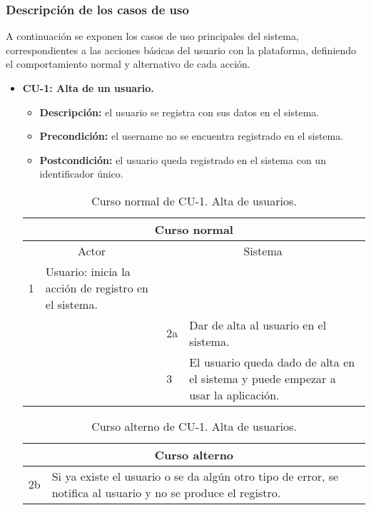 \subsubsection{Descripción de los casos de uso}
A continuación se exponen los casos de uso principales del sistema, correspondientes a las acciones básicas del usuario con la plataforma, definiendo el comportamiento normal y alternativo de cada acción.

\begin{itemize}
	\item \textbf{CU-1: Alta de un usuario.}
	\begin{itemize}
		\item \textbf{Descripción:} el usuario se registra con sus datos en el sistema.
		\item \textbf{Precondición:} el username no se encuentra registrado en el sistema.
		\item \textbf{Postcondición:} el usuario queda registrado en el sistema con un identificador único.
	\end{itemize}
	\begin{table}[H]
		\centering
		\begin{tabular}{|p{0.3cm}|p{5cm}|p{0.3cm}|p{5cm}|}
			\hline
			\multicolumn{4}{|c|}{Curso normal} \\ \hline
			\multicolumn{2}{|c|}{Actor} & \multicolumn{2}{|c|}{Sistema} \\ \hline
			1 & Usuario: inicia la acción de registro en el sistema. &  &  \\ \hline
			  &  & 2a & Dar de alta al usuario en el sistema. \\ \hline
			  &  & 3 & El usuario queda dado de alta en el sistema y puede empezar a usar la aplicación. \\ \hline
		\end{tabular}
		\caption{Curso normal de CU-1. Alta de usuarios.}
		\label{tabla:cu1-normal}
	\end{table}
	
	\begin{table}[H]
		\centering
		\begin{tabular}{|p{0.3cm}|p{10cm}|}
			\hline
			\multicolumn{2}{|c|}{Curso alterno} \\ \hline
			2b & Si ya existe el usuario o se da algún otro tipo de error, se notifica al usuario y no se produce el registro. \\ \hline
		\end{tabular}
		\caption{Curso alterno de CU-1. Alta de usuarios.}
		\label{tabla:cu1-alterno}
	\end{table}
\end{itemize}

